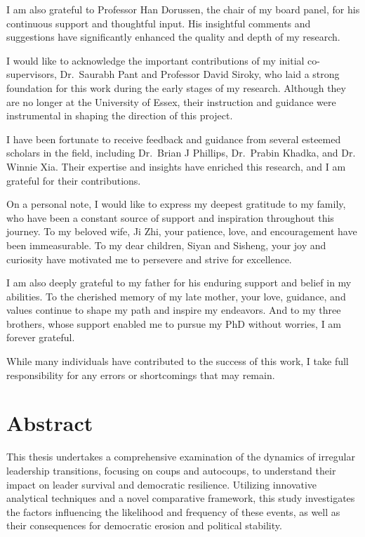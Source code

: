 \documentclass[
  12pt,
]{report}
\begin{document}
I am also grateful to Professor Han Dorussen, the chair of my board
panel, for his continuous support and thoughtful input. His insightful
comments and suggestions have significantly enhanced the quality and
depth of my research.

I would like to acknowledge the important contributions of my initial
co-supervisors, Dr.~Saurabh Pant and Professor David Siroky, who laid a
strong foundation for this work during the early stages of my research.
Although they are no longer at the University of Essex, their
instruction and guidance were instrumental in shaping the direction of
this project.

I have been fortunate to receive feedback and guidance from several
esteemed scholars in the field, including Dr.~Brian J Phillips,
Dr.~Prabin Khadka, and Dr. Winnie Xia. Their expertise and insights have
enriched this research, and I am grateful for their contributions.

On a personal note, I would like to express my deepest gratitude to my
family, who have been a constant source of support and inspiration
throughout this journey. To my beloved wife, Ji Zhi, your patience,
love, and encouragement have been immeasurable. To my dear children,
Siyan and Sisheng, your joy and curiosity have motivated me to persevere
and strive for excellence.

I am also deeply grateful to my father for his enduring support and
belief in my abilities. To the cherished memory of my late mother, your
love, guidance, and values continue to shape my path and inspire my
endeavors. And to my three brothers, whose support enabled me to pursue
my PhD without worries, I am forever grateful.

While many individuals have contributed to the success of this work, I
take full responsibility for any errors or shortcomings that may remain.

\chapter*{Abstract}\label{abstract}

This thesis undertakes a comprehensive examination of the dynamics of
irregular leadership transitions, focusing on coups and autocoups, to
understand their impact on leader survival and democratic resilience.
Utilizing innovative analytical techniques and a novel comparative
framework, this study investigates the factors influencing the
likelihood and frequency of these events, as well as their consequences
for democratic erosion and political stability.
\end{document}
